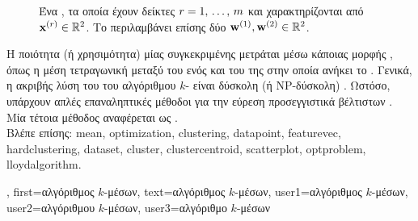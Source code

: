 {{\begin{figure}[H]
\begin{center}
		\end{center}
		{
		\caption{\foreignlanguage{greek}{Ένα}  , \foreignlanguage{greek}{τα οποία έχουν 
			δεί\-κτες $r=1,\,\ldots,\,m$ και χαρακτηρίζονται από}  
			${\bf x}^{(r)} \in \mathbb{R}^{2}$. \foreignlanguage{greek}{Το}  
			\foreignlanguage{greek}{περιλαμβάνει επίσης δύο} 
			${{\bf w}}^{(1)}, {{\bf w}}^{(2)} \in \mathbb{R}^{2}$. \label{fig_kmeans_dict}} }
		\end{figure} 
		\foreignlanguage{greek}{Η ποιότητα (ή χρησιμότητα) μίας συγκεκριμένης}  \foreignlanguage{greek}{μετράται 
		μέσω κάποιας μορφής} , \foreignlanguage{greek}{όπως η μέση τετραγωνική}  
		\foreignlanguage{greek}{μεταξύ του}  \foreignlanguage{greek}{ενός}  
		\foreignlanguage{greek}{και του}  \foreignlanguage{greek}{της}  
		\foreignlanguage{greek}{στην οποία ανήκει το} . 
		\foreignlanguage{greek}{Γενικά, η ακριβής λύση του}  \foreignlanguage{greek}{του αλγόριθμου} 
		$k$- \foreignlanguage{greek}{είναι δύσκολη (ή} NP-\foreignlanguage{greek}{δύσκολη)} \cite{Mahajan2009Springer}. 
		\foreignlanguage{greek}{Ωστόσο, υπάρχουν απλές επαναληπτικές μέθοδοι για την εύρεση προσεγγιστικά βέλτιστων} 
		. \foreignlanguage{greek}{Μία τέτοια μέθοδος αναφέρεται ως} .
		\\
		\foreignlanguage{greek}{Βλέπε επίσης:} \gls{mean}, \gls{optimization}, \gls{clustering}, \gls{datapoint}, \gls{featurevec}, \gls{hardclustering}, 
		\gls{dataset}, \gls{cluster}, \gls{clustercentroid}, \gls{scatterplot}, \gls{optproblem}, \gls{lloydalgorithm}.},
	first={\foreignlanguage{greek}{αλγόριθμος $k$-μέσων}},
	text={\foreignlanguage{greek}{αλγόριθμος $k$-μέσων}},
	user1={\foreignlanguage{greek}{αλγόριθμος $k$-μέσων}}, %
	user2={\foreignlanguage{greek}{αλγόριθμου $k$-μέσων}}, %
	user3={\foreignlanguage{greek}{αλγόριθμο $k$-μέσων}} %
}

